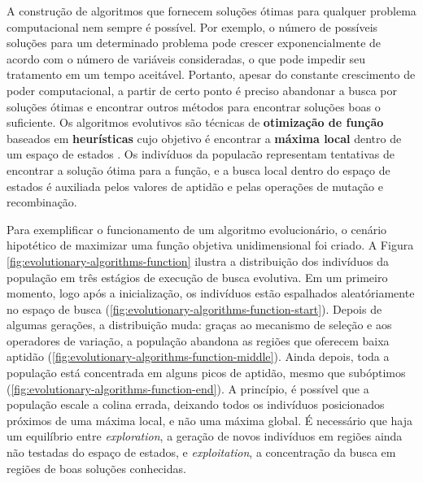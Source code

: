 A construção de algoritmos que fornecem soluções ótimas para qualquer problema
computacional nem sempre é possível. Por exemplo, o número de possíveis soluções
para um determinado problema pode crescer exponencialmente de acordo com o
número de variáveis consideradas, o que pode impedir seu tratamento em um tempo
aceitável. Portanto, apesar do constante crescimento de poder computacional, a
partir de certo ponto é preciso abandonar a busca por soluções ótimas e
encontrar outros métodos para encontrar soluções boas o suficiente. Os
algoritmos evolutivos são técnicas de \textbf{otimização de função} baseados em
\textbf{heurísticas} cujo objetivo é encontrar a \textbf{máxima local} dentro de
um espaço de estados \cite[Cap. 3]{IntroEvolComputing}. Os indivíduos da
populacão representam tentativas de encontrar a solução ótima para a função, e a
busca local dentro do espaço de estados é auxiliada pelos valores de aptidão e
pelas operações de mutação e recombinação.

Para exemplificar o funcionamento de um algoritmo evolucionário, o cenário
hipotético de maximizar uma função objetiva unidimensional foi criado. A Figura
\ref{fig:evolutionary-algorithms-function} ilustra a distribuição dos indivíduos
da população em três estágios de execução de busca evolutiva. Em um primeiro
momento, logo após a inicialização, os indivíduos estão espalhados
aleatóriamente no espaço de busca
(\ref{fig:evolutionary-algorithms-function-start}). Depois de algumas gerações,
a distribuição muda: graças ao mecanismo de seleção e aos operadores de
variação, a população abandona as regiões que oferecem baixa aptidão
(\ref{fig:evolutionary-algorithms-function-middle}). Ainda depois, toda a
população está concentrada em alguns picos de aptidão, mesmo que subóptimos
(\ref{fig:evolutionary-algorithms-function-end}). A princípio, é possível que a
população escale a colina errada, deixando todos os indivíduos posicionados
próximos de uma máxima local, e não uma máxima global. É necessário que haja um
equilíbrio entre \textit{exploration}, a geração de novos indivíduos em regiões
ainda não testadas do espaço de estados, e \textit{exploitation}, a concentração
da busca em regiões de boas soluções conhecidas.

